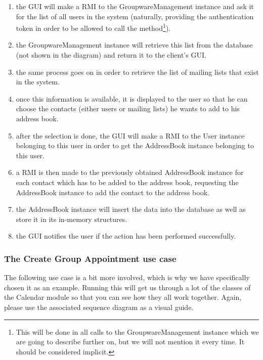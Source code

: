 \documentclass[a4paper,10pt]{article}
\begin{document}
\begin{enumerate}

\item the GUI will make a RMI to the GroupwareManagement instance and ask it for the
list of all users in the system (naturally, providing the authentication token in order to be
allowed to call the method\footnote{This will be done in all calls to the GroupwareManagement
instance which we are going to describe further on, but we will not mention it every time.
It should be considered implicit.}).

\item the GroupwareManagement instance will retrieve this list from the database (not
shown in the diagram) and return it to the client's GUI.

\item the same process goes on in order to retrieve the list of mailing lists that exist in
the system.

\item once this information is available, it is displayed to the user so that he can choose
the contacts (either users or mailing lists) he wants to add to his address book.

\item after the selection is done, the GUI will make a RMI to the User instance belonging
to this user in order to get the AddressBook instance belonging to this user.

\item a RMI is then made to the previously obtained AddressBook instance for each contact
which has to be added to the address book, requesting the AddressBook instance to add
the contact to the address book.

\item the AddressBook instance will insert the data into the database as well as store it in
its in-memory structures.

\item the GUI notifies the user if the action has been performed successfully.

\end{enumerate}

\subsubsection*{The Create Group Appointment use case}

The following use case is a bit more involved, which is why we have specifically chosen it as
an example. Running this will get us through a lot of the classes of the Calendar module so
that you can see how they all work together. Again, please use the associated sequence
diagram as a visual guide.
\end{document}
